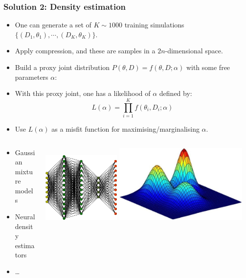 \documentclass[%
    9pt,
]{beamer}
\begin{document}
\begin{frame}
  \frametitle{Solution 2: Density estimation}
      \begin{itemize}
          \item One can generate a set of $K\sim1000$ training simulations $\{(D_1,\theta_1),\cdots,(D_K,\theta_K)\}$.
          \item Apply compression, and these are samples in a $2n$-dimensional space.
          \item Build a proxy joint distribution $P(\theta,D) = f(\theta, D; \alpha)$ with some free parameters $\alpha$:
          \item With this proxy joint, one has a likelihood of $\alpha$ defined by:
              \[
                  L(\alpha) = \prod_{i=1}^K f(\theta_i, D_i; \alpha)
              \]
          \item Use $L(\alpha)$ as a misfit function for maximising/marginalising $\alpha$.
      \end{itemize}
      \begin{columns}
        \begin{column}{0.4\textwidth}
              \begin{itemize}
                  \item Gaussian mixture models
                  \item Neural density estimators
                  \item \ldots
              \end{itemize}
        \end{column}
        \begin{column}{0.6\textwidth}
            \hfill
            \includegraphics[width=0.35\textwidth]{./figures/nn.png}
            \hfill
            \includegraphics[width=0.6\textwidth]{./figures/mixture_gaussian.jpeg}
            \hfill
        \end{column}
      \end{columns}
\end{frame}
\end{document}

